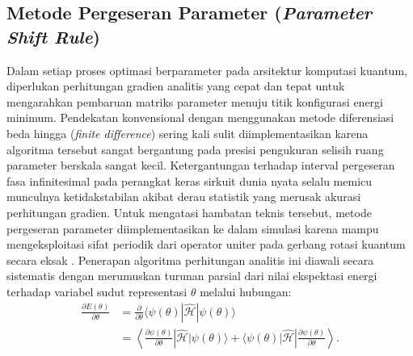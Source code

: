 \subsection{Metode Pergeseran Parameter (\textit{Parameter Shift Rule})}
Dalam setiap proses optimasi berparameter pada arsitektur komputasi kuantum, diperlukan perhitungan gradien analitis yang cepat dan tepat untuk mengarahkan pembaruan matriks parameter menuju titik konfigurasi energi minimum. Pendekatan konvensional dengan menggunakan metode diferensiasi beda hingga (\textit{finite difference}) sering kali sulit diimplementasikan karena algoritma tersebut sangat bergantung pada presisi pengukuran selisih ruang parameter berskala sangat kecil. Ketergantungan terhadap interval pergeseran fasa infinitesimal pada perangkat keras sirkuit dunia nyata selalu memicu munculnya ketidakstabilan akibat derau statistik yang merusak akurasi perhitungan gradien. Untuk mengatasi hambatan teknis tersebut, metode pergeseran parameter diimplementasikan ke dalam simulasi karena mampu mengeksploitasi sifat periodik dari operator uniter pada gerbang rotasi kuantum secara eksak . Penerapan algoritma perhitungan analitis ini diawali secara sistematis dengan merumuskan turunan parsial dari nilai ekspektasi energi terhadap variabel sudut representasi $\theta$ melalui hubungan:
\begin{equation}
    \begin{split}
    \frac{\partial E(\theta)}{\partial \theta}
    &= \frac{\partial}{\partial \theta}
    \langle \psi(\theta)|\hat{\mathcal{H}}|\psi(\theta)\rangle \\
    &= \left\langle \frac{\partial \psi(\theta)}{\partial \theta}
    \right|
    \hat{\mathcal{H}}
    |\psi(\theta)\rangle
    +
    \langle \psi(\theta)|
    \hat{\mathcal{H}}
    \left|
    \frac{\partial \psi(\theta)}{\partial \theta}
    \right\rangle.
    \end{split}
\end{equation}


